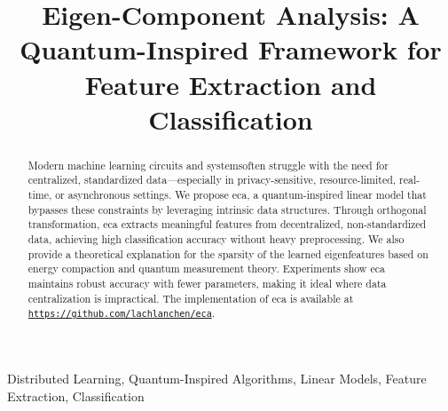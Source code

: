 \documentclass[lettersize,journal]{IEEEtran}
\begin{document}
\title{Eigen-Component Analysis: A Quantum-Inspired Framework for Feature Extraction and Classification}
\author{}

\author{
}


\maketitle

\begin{abstract}
Modern machine learning circuits and systemsoften struggle with the need for centralized, standardized data—especially in privacy-sensitive, resource-limited, real-time, or asynchronous settings. We propose \gls{eca}, a quantum-inspired linear model that bypasses these constraints by leveraging intrinsic data structures. Through orthogonal transformation, \gls{eca} extracts meaningful features from decentralized, non-standardized data, achieving high classification accuracy without heavy preprocessing. We also provide a theoretical explanation for the sparsity of the learned eigenfeatures based on energy compaction and quantum measurement theory.
Experiments show \gls{eca} maintains robust accuracy with fewer parameters, making it ideal where data centralization is impractical.
The implementation of \gls{eca} is available at 
\href{https://github.com/lachlanchen/eca}{\texttt{https://github.com/lachlanchen/eca}}.
\end{abstract}

\begin{IEEEkeywords}
Distributed Learning,
Quantum-Inspired Algorithms,
Linear Models, Feature Extraction, Classification
\end{IEEEkeywords}
\end{document}
